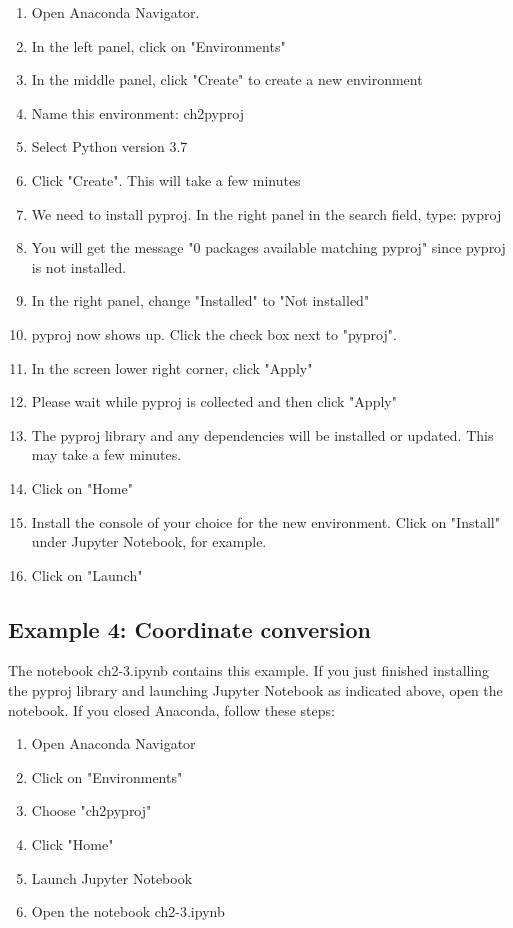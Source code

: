 \documentclass[a4paper , 12pt]{book}
\begin{document}
\begin{enumerate}
    \item Open Anaconda Navigator.
    \item In the left panel, click on "Environments"
    \item In the middle panel, click "Create" to create a new environment
    \item Name this environment: ch2pyproj
    \item Select Python version 3.7
    \item Click "Create". This will take a few minutes
    \item We need to install pyproj. In the right panel in the search field, type: pyproj
    \item You will get the message "0 packages available matching pyproj" since pyproj is not installed. 
    \item In the right panel, change "Installed" to "Not installed"
    \item pyproj now shows up. Click the check box next to "pyproj".
    \item In the screen lower right corner, click "Apply"
    \item Please wait while pyproj is collected and then click "Apply"
    \item The pyproj library and any dependencies will be installed or updated. This may take a few minutes.
    \item Click on "Home"
    \item Install the console of your choice for the new environment. Click on "Install" under Jupyter Notebook, for example.
    \item Click on "Launch"
\end{enumerate}

\subsection*{Example 4: Coordinate conversion}

The notebook ch2-3.ipynb contains this example. If you just finished installing the pyproj library and launching Jupyter Notebook as indicated above, open the notebook. If you closed Anaconda, follow these steps:

\begin{enumerate}
    \item Open Anaconda Navigator
    \item Click on "Environments"
    \item Choose "ch2pyproj"
    \item Click "Home"
    \item Launch Jupyter Notebook
    \item Open the notebook ch2-3.ipynb
\end{enumerate}{}
\end{document}
